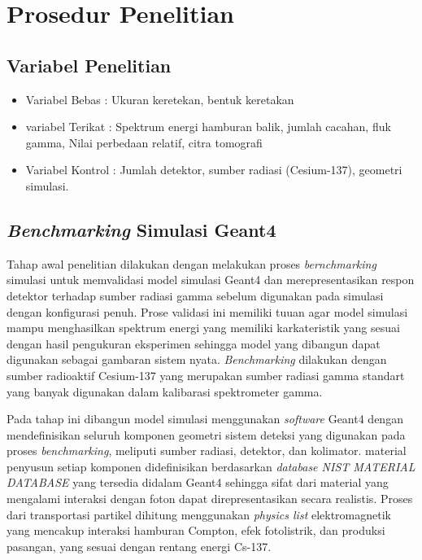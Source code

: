 \documentclass[12pt,a4paper]{report}
\begin{document}
\section{Prosedur Penelitian}
\subsection{Variabel Penelitian}
\begin{itemize}
    \item Variabel Bebas    : Ukuran keretekan, bentuk keretakan
    \item variabel Terikat  : Spektrum energi hamburan balik, jumlah cacahan, fluk gamma, Nilai perbedaan relatif, citra tomografi
    \item Variabel Kontrol  : Jumlah detektor, sumber radiasi (Cesium-137), geometri simulasi.
\end{itemize}


\subsection{\textit{Benchmarking} Simulasi Geant4}
Tahap awal penelitian dilakukan dengan melakukan proses \textit{bernchmarking} simulasi untuk memvalidasi model simulasi Geant4 dan merepresentasikan respon detektor terhadap
sumber radiasi gamma sebelum digunakan pada simulasi dengan konfigurasi penuh. Prose validasi ini memiliki tuuan agar model simulasi mampu menghasilkan spektrum energi yang memiliki 
karkateristik yang sesuai dengan hasil pengukuran eksperimen sehingga model yang dibangun dapat digunakan sebagai gambaran sistem nyata. \textit{Benchmarking} dilakukan dengan sumber 
radioaktif Cesium-137 yang merupakan sumber radiasi gamma standart yang banyak digunakan dalam kalibarasi spektrometer gamma.

Pada tahap ini dibangun model simulasi menggunakan \textit{software} Geant4 dengan mendefinisikan seluruh komponen geometri sistem deteksi yang digunakan pada proses \textit{benchmarking}, meliputi 
sumber radiasi, detektor, dan kolimator. material penyusun setiap komponen didefinisikan berdasarkan \textit{database NIST MATERIAL DATABASE} yang tersedia didalam Geant4 sehingga sifat dari 
material yang mengalami interaksi dengan foton dapat direpresentasikan secara realistis. Proses dari transportasi partikel dihitung menggunakan \textit{physics list} elektromagnetik yang mencakup 
interaksi hamburan Compton, efek fotolistrik, dan produksi pasangan, yang sesuai dengan rentang energi Cs-137.
\end{document}

